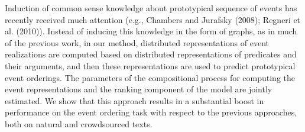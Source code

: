 Induction of common sense knowledge about prototypical sequence of events has recently received much attention (e.g., Chambers and Jurafsky (2008); Regneri et al. (2010)). Instead of inducing this knowledge in the form of graphs, as in much of the previous work, in our method, distributed representations of event realizations are computed based on distributed representations of predicates and their arguments, and then these representations are used to predict prototypical event orderings. The parameters of the compositional process for computing the event representations and the ranking component of the model are jointly estimated. We show that this approach results in a substantial boost in performance on the event ordering task with respect to the previous approaches, both on natural and crowdsourced texts.
